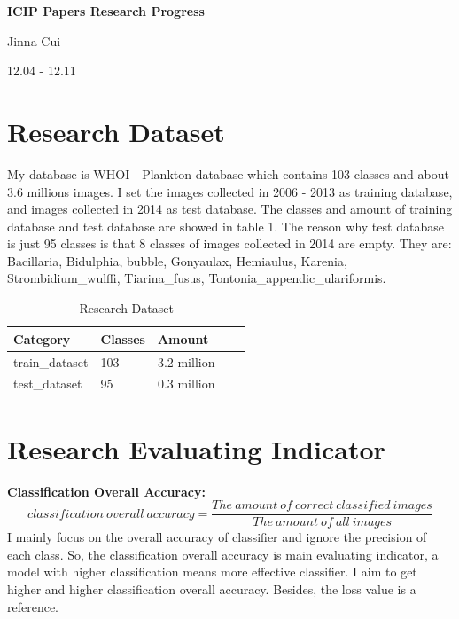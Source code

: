 \documentclass{article}
\begin{document}


\pagestyle{fancy}
\begin{center}
\textbf{\LARGE{ICIP Papers Research Progress}} %
\end{center}

\begin{center}
Jinna Cui
\end{center}

\begin{center}
12.04 - 12.11
\end{center}
\section{Research Dataset}
My database is WHOI - Plankton database which contains 103 classes and about 3.6 millions images. I set the images collected in 2006 - 2013 as training database, and images collected in 2014 as test database. The classes and amount of training database and test database are showed in table 1. The reason why test database is just 95 classes is that 8 classes of images collected in 2014 are empty. They are: Bacillaria, Bidulphia, bubble, Gonyaulax, Hemiaulus, Karenia, Strombidium\_wulffi, Tiarina\_fusus, Tontonia\_appendic\_ulariformis. 

\begin{table}[!ht]
  \caption{Research Dataset}
  \centering
  \begin{tabular}{lllll}
    \toprule
    \cmidrule{1-3}
    Category     &Classes      &Amount \\
    \midrule
    train\_dataset & 103   & 3.2 million \\ \hline
    test\_dataset & 95   &0.3 million   \\
    \bottomrule
  \end{tabular}
\end{table}

\section{Research Evaluating Indicator}
\textbf{\large{Classification Overall Accuracy:}}
\[
classification\ overall\ accuracy =  \frac{The\ amount\ of\ correct\ classified\ images}{The\ amount\ of\ all\ images}
\]
I mainly focus on the overall accuracy of classifier and ignore the precision of each class. So, the classification overall accuracy is main evaluating indicator, a model with higher classification means more effective classifier. I aim to get higher and higher classification overall accuracy. Besides, the loss value is a reference.
\end{document}

